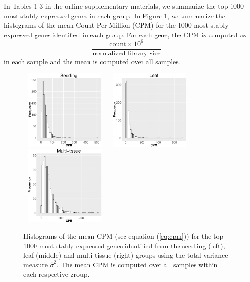 \documentclass[letterpaper,12pt]{article}
\begin{document}
In Tables 1-3 in the online supplementary materials, we summarize the
top 1000 most stably expressed genes in each group.  In Figure \ref{cpm}, we
summarize the histograms of the mean Count Per Million (CPM) for the 1000
most stably expressed genes identified in each group. For each gene, the CPM
is computed as
\begin{equation}\label{eq:cpm}
 \dfrac{ \text{count} \times 10^6 }{ \text{normalized library size}} 
\end{equation}
in each sample and the mean is computed over all samples.
 
\begin{figure}[tbp] \begin{center}
    \includegraphics[width=4.5cm,height=4cm]{Figures/cpm_seedling.eps}
    \includegraphics[width=4.5cm,height=4cm]{Figures/cpm_leaves.eps}
    \includegraphics[width=4.5cm,height=4cm]{Figures/cpm_tissue.eps}
    \caption{{\small{\label{cpm} 
    Histograms of the mean CPM (see equation (\ref{eq:cpm})) for the top 1000
    most stably expressed genes identified from the seedling (left), leaf (middle) and multi-tissue
    (right) groups
    using  the total variance measure $\hat{\sigma}^2$}}. 
    The mean CPM is computed over all samples within each respective group.
    } \end{center} 
\end{figure} 
\end{document}
